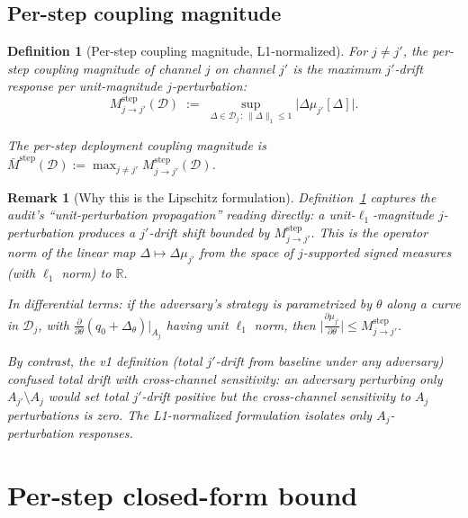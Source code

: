 \documentclass{article}
\newtheorem{definition}{Definition}
\newtheorem{remark}{Remark}
\begin{document}
\subsection{Per-step coupling magnitude}

\begin{definition}[Per-step coupling magnitude, L1-normalized]
\label{def:M-formal-v2}
For $j \neq j'$, the \emph{per-step coupling magnitude} of channel
$j$ on channel $j'$ is the maximum $j'$-drift response per
unit-magnitude $j$-perturbation:
\begin{equation}
\label{eq:M-def-v2}
  M_{j \to j'}^{\mathrm{step}}(\mathcal{D})
  \;:=\; \sup_{\Delta \in \mathcal{D}_j \,:\, \|\Delta\|_1 \leq 1}
  \big| \Delta\mu_{j'}[\Delta] \big|.
\end{equation}

The \emph{per-step deployment coupling magnitude} is
$\bar{M}^{\mathrm{step}}(\mathcal{D}) := \max_{j \neq j'}
M_{j \to j'}^{\mathrm{step}}(\mathcal{D})$.
\end{definition}

\begin{remark}[Why this is the Lipschitz formulation]
\label{rem:lipschitz}
Definition~\ref{def:M-formal-v2} captures the audit's
``unit-perturbation propagation'' reading directly: a
unit-$\ell_1$-magnitude $j$-perturbation produces a $j'$-drift
shift bounded by $M_{j \to j'}^{\mathrm{step}}$.  This is the
operator norm of the linear map $\Delta \mapsto \Delta\mu_{j'}$
from the space of $j$-supported signed measures (with $\ell_1$ norm)
to $\mathbb{R}$.

In differential terms: if the adversary's strategy is parametrized
by $\theta$ along a curve in $\mathcal{D}_j$, with
$\frac{\partial}{\partial \theta} (q_0 + \Delta_\theta)|_{A_j}$
having unit $\ell_1$ norm,
then $\big|\frac{\partial \mu_{j'}}{\partial \theta}\big|
\leq M_{j \to j'}^{\mathrm{step}}$.

By contrast, the v1 definition (total $j'$-drift from baseline
under any adversary) confused total drift with cross-channel
sensitivity: an adversary perturbing only $A_{j'} \setminus A_j$
would set total $j'$-drift positive but the cross-channel
sensitivity to $A_j$ perturbations is zero.  The L1-normalized
formulation isolates only $A_j$-perturbation responses.
\end{remark}

\section{Per-step closed-form bound}
\end{document}
